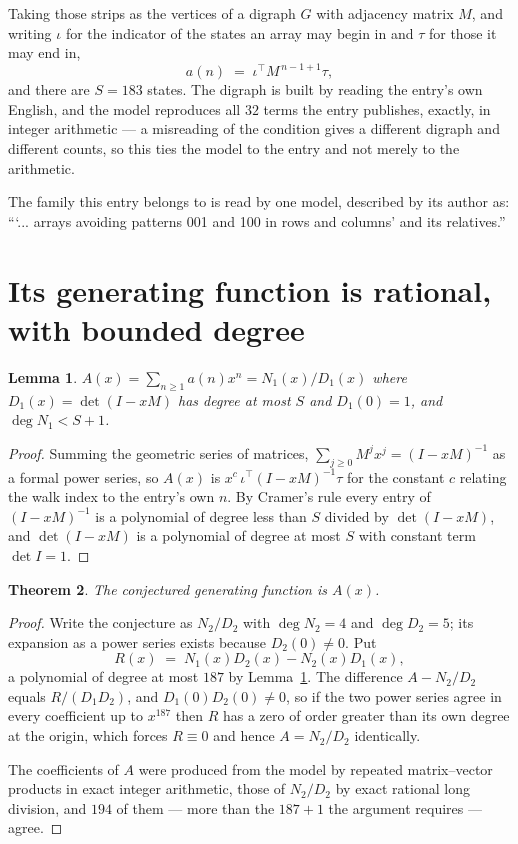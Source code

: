 \documentclass[11pt,a4paper]{article}
\theoremstyle{plain}
\newtheorem{theorem}{Theorem}
\newtheorem{lemma}[theorem]{Lemma}
\theoremstyle{definition}
\begin{document}
Taking those strips as the vertices of a digraph $G$ with adjacency matrix $M$, and writing
$\iota$ for the indicator of the states an array may begin in and $\tau$ for those it may end
in,
\[
a(n)\;=\;\iota^{\!\top}M^{\,n-1+1}\tau ,
\]
and there are $S=183$ states. The digraph is built by reading the entry's own English, and the
model reproduces all $32$ terms the entry publishes, exactly, in integer arithmetic --- a
misreading of the condition gives a different digraph and different counts, so this ties the
model to the entry and not merely to the arithmetic.

The family this entry belongs to is read by one model, described by its author as: ```... arrays avoiding patterns 001 and 100 in rows and columns' and its relatives.''


\section{Its generating function is rational, with bounded degree}

\begin{lemma}\label{lem:rat}
$A(x)=\sum_{n\ge1}a(n)x^n=N_1(x)/D_1(x)$ where $D_1(x)=\det(I-xM)$ has degree at most
$S$ and $D_1(0)=1$, and $\deg N_1<S+1$.
\end{lemma}

\begin{proof}
Summing the geometric series of matrices, $\sum_{j\ge0}M^jx^j=(I-xM)^{-1}$ as a formal
power series, so $A(x)$ is $x^{c}\,\iota^{\!\top}(I-xM)^{-1}\tau$ for the constant $c$
relating the walk index to the entry's own $n$. By Cramer's rule every entry of
$(I-xM)^{-1}$ is a polynomial of degree less than $S$ divided by $\det(I-xM)$, and
$\det(I-xM)$ is a polynomial of degree at most $S$ with constant term $\det I=1$.
\end{proof}

\begin{theorem}
The conjectured generating function is $A(x)$.
\end{theorem}

\begin{proof}
Write the conjecture as $N_2/D_2$ with $\deg N_2=4$ and $\deg D_2=5$; its expansion as a
power series exists because $D_2(0)\neq0$. Put
\[
R(x)\;=\;N_1(x)D_2(x)-N_2(x)D_1(x),
\]
a polynomial of degree at most $187$ by Lemma~\ref{lem:rat}. The difference
$A-N_2/D_2$ equals $R/(D_1D_2)$, and $D_1(0)D_2(0)\neq0$, so if the two power series agree in
every coefficient up to $x^{187}$ then $R$ has a zero of order greater than its own
degree at the origin, which forces $R\equiv0$ and hence $A=N_2/D_2$ identically.

The coefficients of $A$ were produced from the model by repeated matrix--vector products in
exact integer arithmetic, those of $N_2/D_2$ by exact rational long division, and $194$
of them --- more than the $187+1$ the argument requires --- agree.
\end{proof}
\end{document}
